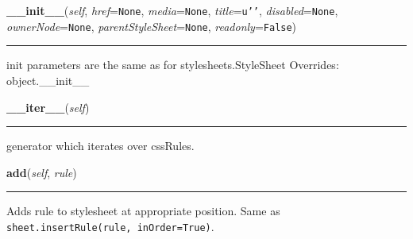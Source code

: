 \hspace{.8\funcindent}\begin{boxedminipage}{\funcwidth}

    \raggedright \textbf{\_\_init\_\_}(\textit{self}, \textit{href}={\tt None}, \textit{media}={\tt None}, \textit{title}={\tt \texttt{u'}\texttt{}\texttt{'}}, \textit{disabled}={\tt None}, \textit{ownerNode}={\tt None}, \textit{parentStyleSheet}={\tt None}, \textit{readonly}={\tt False})

    \vspace{-1.5ex}

    \rule{\textwidth}{0.5\fboxrule}
\setlength{\parskip}{2ex}

init parameters are the same as for stylesheets.StyleSheet
\setlength{\parskip}{1ex}
      Overrides: object.\_\_init\_\_

    \end{boxedminipage}

    \label{cssutils:css:cssstylesheet:CSSStyleSheet:__iter__}

    \vspace{0.5ex}

\hspace{.8\funcindent}\begin{boxedminipage}{\funcwidth}

    \raggedright \textbf{\_\_iter\_\_}(\textit{self})

    \vspace{-1.5ex}

    \rule{\textwidth}{0.5\fboxrule}
\setlength{\parskip}{2ex}

generator which iterates over cssRules.
\setlength{\parskip}{1ex}
    \end{boxedminipage}

    \label{cssutils:css:cssstylesheet:CSSStyleSheet:add}

    \vspace{0.5ex}

\hspace{.8\funcindent}\begin{boxedminipage}{\funcwidth}

    \raggedright \textbf{add}(\textit{self}, \textit{rule})

    \vspace{-1.5ex}

    \rule{\textwidth}{0.5\fboxrule}
\setlength{\parskip}{2ex}

Adds rule to stylesheet at appropriate position.
Same as \texttt{sheet.insertRule(rule, inOrder=True)}.
\setlength{\parskip}{1ex}
    \end{boxedminipage}

